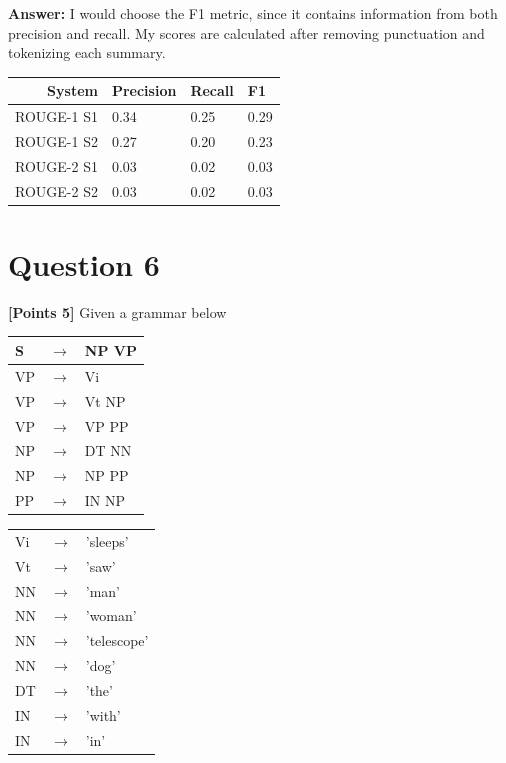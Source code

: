 \documentclass[12pt]{article}
\begin{document}
\textbf{Answer:} I would choose the F1 metric, since it contains information
from both precision and recall. My scores are calculated after removing
punctuation and tokenizing each summary.

\begin{table}[!ht]
      \centering
      \begin{tabular}{|r|lll|}
            \hline
            System     & Precision & Recall & F1   \\
            \hline
            ROUGE-1 S1 & 0.34      & 0.25   & 0.29 \\
            ROUGE-1 S2 & 0.27      & 0.20   & 0.23 \\
            \hline
            ROUGE-2 S1 & 0.03      & 0.02   & 0.03 \\
            ROUGE-2 S2 & 0.03      & 0.02   & 0.03 \\
            \hline
      \end{tabular}
\end{table}
\newpage
\section*{Question 6}
\textbf{[Points 5]} Given a grammar below

\begin{tabular}{|lll|}
      \hline
      S  & $\rightarrow$ & NP VP \\
      \hline
      VP & $\rightarrow$ & Vi    \\
      VP & $\rightarrow$ & Vt NP \\
      VP & $\rightarrow$ & VP PP \\
      \hline
      NP & $\rightarrow$ & DT NN \\
      NP & $\rightarrow$ & NP PP \\
      \hline
      PP & $\rightarrow$ & IN NP \\
      \hline
\end{tabular}

\begin{tabular}{|lll|}
      \hline
      Vi & $\rightarrow$ & 'sleeps'    \\
      Vt & $\rightarrow$ & 'saw'       \\
      \hline
      NN & $\rightarrow$ & 'man'       \\
      NN & $\rightarrow$ & 'woman'     \\
      NN & $\rightarrow$ & 'telescope' \\
      NN & $\rightarrow$ & 'dog'       \\
      \hline
      DT & $\rightarrow$ & 'the'       \\
      \hline
      IN & $\rightarrow$ & 'with'      \\
      IN & $\rightarrow$ & 'in'        \\
      \hline
\end{tabular}
\end{document}
